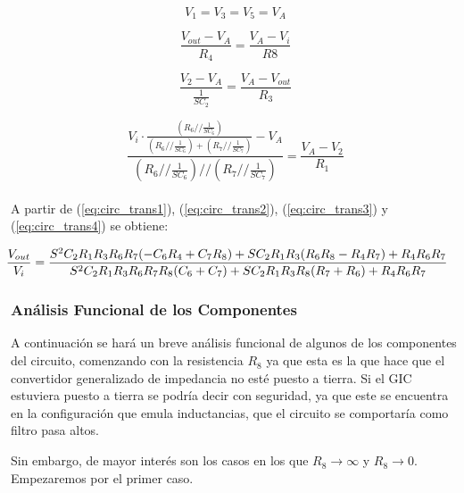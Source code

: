 \documentclass[a4paper]{article}
\begin{document}
\begin{equation}
V_1=V_3=V_5=V_A
\label{eq:circ_trans1}
\end{equation}

\begin{equation}
\frac{V_{out} - V_A}{R_4} = \frac{V_A-V_i}{R8}
\label{eq:circ_trans2}
\end{equation}

\begin{equation}
\frac{V_2 - V_A}{\frac{1}{SC_2}} = \frac{V_A-V_{out}}{R_3}
\label{eq:circ_trans3}
\end{equation}

\begin{equation}
\frac{V_i \cdot \frac{\left(R_6 // \frac{1}{SC_6}\right)}{\left(R_6 // \frac{1}{SC_6}\right) + \left(R_7 // \frac{1}{SC_7}\right)} - V_A}{\left(R_6 // \frac{1}{SC_6}\right) // \left(R_7 // \frac{1}{SC_7}\right)} = \frac{V_A-V_2}{R_1}
\label{eq:circ_trans4}
\end{equation} \\

A partir de (\ref{eq:circ_trans1}), (\ref{eq:circ_trans2}), (\ref{eq:circ_trans3}) y (\ref{eq:circ_trans4}) se obtiene:

\begin{equation}
\hspace{-0.5cm}
\frac{V_{out}}{V_i} = \frac{S^2 C_2 R_1 R_3 R_6 R_7 (-C_6 R_4 + C_7 R_8) + S C_2 R_1 R_3 (R_6 R_8 - R_4 R_7) + R_4 R_6 R_7}{S^2 C_2 R_1 R_3 R_6 R_7 R_8 (C_6 + C_7)+S C_2 R_1 R_3 R_8 (R_7 + R_6) + R_4 R_6 R_7}
\label{circ_trans}
\end{equation}

\subsubsection{Análisis Funcional de los Componentes}
	
A continuación se hará un breve análisis funcional de algunos de los componentes del circuito, comenzando con la resistencia $R_8$ ya que esta es la que hace que el convertidor generalizado de impedancia no esté puesto a tierra. Si el GIC estuviera puesto a tierra se podría decir con seguridad, ya que este se encuentra en la configuración que emula inductancias, que el circuito se comportaría como filtro pasa altos.

Sin embargo, de mayor interés son los casos en los que $R_8 \rightarrow \infty$ y $R_8 \rightarrow 0$. Empezaremos por el primer caso.
\end{document}

